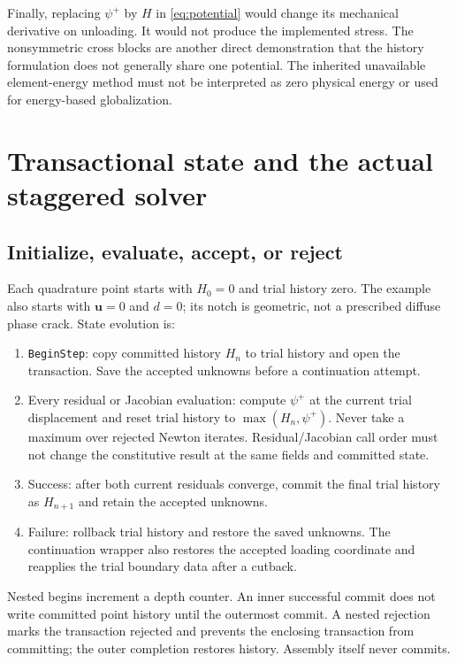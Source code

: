 \documentclass[11pt,a4paper]{article}
\newcommand{\uu}{\bm{u}}
\newcommand{\code}[1]{\texttt{\small #1}}
\newcommand{\sectionpage}[1]{\clearpage\section{#1}}
\numberwithin{equation}{section}
\begin{document}
Finally, replacing $\psi^+$ by $H$ in \eqref{eq:potential} would change its
mechanical derivative on unloading. It would not produce the implemented
stress. The nonsymmetric cross blocks are another direct demonstration that
the history formulation does not generally share one potential. The inherited
unavailable element-energy method must not be interpreted as zero physical
energy or used for energy-based globalization.

\sectionpage{Transactional state and the actual staggered solver}
\label{sec:solver}
\subsection{Initialize, evaluate, accept, or reject}
Each quadrature point starts with $H_0=0$ and trial history zero. The example
also starts with $\uu=0$ and $d=0$; its notch is geometric, not a prescribed
diffuse phase crack. State evolution is:
\begin{enumerate}
\item \code{BeginStep}: copy committed history $H_n$ to trial history and open
the transaction. Save the accepted unknowns before a continuation attempt.
\item Every residual or Jacobian evaluation: compute $\psi^+$ at the current
trial displacement and reset trial history to $\max(H_n,\psi^+)$. Never take
a maximum over rejected Newton iterates. Residual/Jacobian call order must not
change the constitutive result at the same fields and committed state.
\item Success: after both current residuals converge, commit the final trial
history as $H_{n+1}$ and retain the accepted unknowns.
\item Failure: rollback trial history and restore the saved unknowns. The
continuation wrapper also restores the accepted loading coordinate and
reapplies the trial boundary data after a cutback.
\end{enumerate}
Nested begins increment a depth counter. An inner successful commit does not
write committed point history until the outermost commit. A nested rejection
marks the transaction rejected and prevents the enclosing transaction from
committing; the outer completion restores history. Assembly itself never commits.
\end{document}
